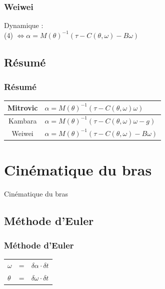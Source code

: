 \documentclass{beamer}
\begin{document}
\begin{frame}
\frametitle{Weiwei}
Dynamique :\\
(4) $\Leftrightarrow \alpha = M(\theta)^{-1} (\tau - C(\theta, \omega) - B\omega) $
\end{frame}

\subsection{Résumé}

\begin{frame}
\frametitle{Résumé}
\begin{tabular}{|c|l|}
    \hline
    Mitrovic & $\alpha = M(\theta)^{-1} (\tau - C(\theta, \omega) \omega)$ \\
    \hline
    Kambara  & $\alpha = M(\theta)^{-1} (\tau - C(\theta, \omega) \omega - g)$ \\
    \hline
    Weiwei   & $\alpha = M(\theta)^{-1} (\tau - C(\theta, \omega) - B\omega)$ \\
    \hline
\end{tabular}
\end{frame}


\section{Cinématique du bras}
\begin{frame}
\begin{center}
{\LARGE Cinématique du bras}
\end{center}
\end{frame}

\subsection{Méthode d'Euler}

\begin{frame}
\frametitle{Méthode d'Euler}
\begin{tabular}{lcl}
    $\omega$ & = & $\delta \alpha \cdot \delta t$ \\
    $\theta$ & = & $\delta \omega \cdot \delta t$ \\
\end{tabular}
\end{frame}
    
\end{document}

